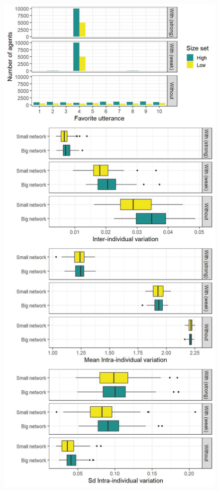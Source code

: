 \documentclass[
]{article}
\begin{document}
\begin{figure}[!H]

{\centering \includegraphics{./Figures/unnamed-chunk-18-1} 

}


\end{figure}
\end{document}
